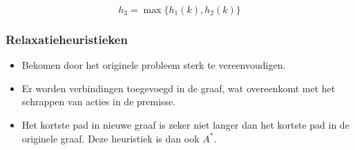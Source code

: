 \begin{itemize}
\begin{itemize}
\begin{itemize}
			$$h_3 = \max\{h_1(k), h_2(k)\}$$
		\end{itemize}
		
	\end{itemize}
\end{itemize}

\subsubsection{Relaxatieheuristieken}
\begin{itemize}
	\item Bekomen door het originele probleem sterk te vereenvoudigen.
	\item Er worden verbindingen toegevoegd in de graaf, wat overeenkomt met het schrappen van acties in de premisse.
	\item Het kortste pad in nieuwe graaf is zeker niet langer dan het kortste pad in de originele graaf. Deze heuristiek is dan ook $A^*$.
\end{itemize}


